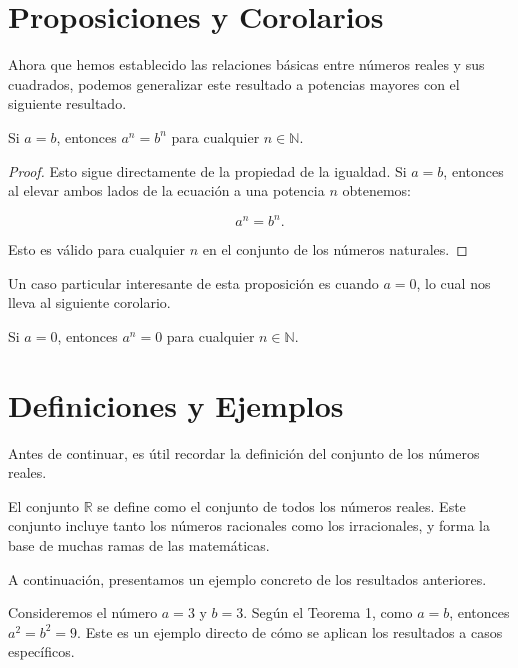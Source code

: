 \section{Proposiciones y Corolarios}

Ahora que hemos establecido las relaciones básicas entre números reales y sus cuadrados, podemos generalizar este resultado a potencias mayores con el siguiente resultado.

\begin{proposition}
Si $a = b$, entonces $a^n = b^n$ para cualquier $n \in \mathbb{N}$.
\end{proposition}

\begin{proof}
Esto sigue directamente de la propiedad de la igualdad. Si $a = b$, entonces al elevar ambos lados de la ecuación a una potencia $n$ obtenemos:

\[
a^n = b^n.
\]

Esto es válido para cualquier $n$ en el conjunto de los números naturales.
\end{proof}

Un caso particular interesante de esta proposición es cuando $a = 0$, lo cual nos lleva al siguiente corolario.

\begin{corollary}
Si $a = 0$, entonces $a^n = 0$ para cualquier $n \in \mathbb{N}$.
\end{corollary}

\section{Definiciones y Ejemplos}

Antes de continuar, es útil recordar la definición del conjunto de los números reales.

\begin{definition}
El conjunto $\mathbb{R}$ se define como el conjunto de todos los números reales. Este conjunto incluye tanto los números racionales como los irracionales, y forma la base de muchas ramas de las matemáticas.
\end{definition}

A continuación, presentamos un ejemplo concreto de los resultados anteriores.

\begin{example}
Consideremos el número $a = 3$ y $b = 3$. Según el Teorema 1, como $a = b$, entonces $a^2 = b^2 = 9$. Este es un ejemplo directo de cómo se aplican los resultados a casos específicos.
\end{example}

